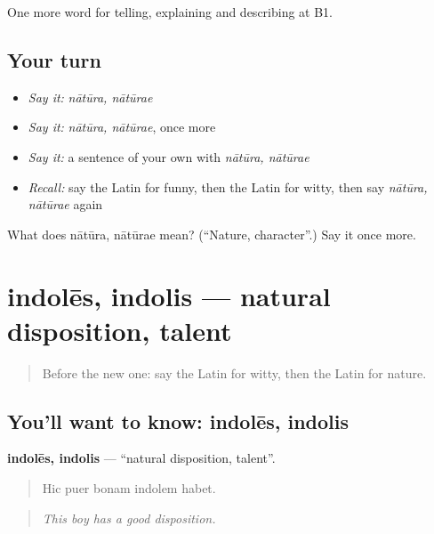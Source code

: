 \begin{grammarlens}[title={What you've built}]
One more word for telling, explaining and describing at B1.
\end{grammarlens}

\subsection*{Your turn}
\begin{itemize}
\raggedright
  \item \emph{Say it:} \emph{nātūra, nātūrae}
  \item \emph{Say it:} \emph{nātūra, nātūrae}, once more
  \item \emph{Say it:} a sentence of your own with \emph{nātūra, nātūrae}
  \item \emph{Recall:} say the Latin for funny, then the Latin for witty, then say \emph{nātūra, nātūrae} again
\end{itemize}

\begin{tcolorbox}[breakable,colback=teal!4,colframe=teal!35!black,title={Before you move on}]
What does nātūra, nātūrae mean? (\textquotedblleft{}Nature, character\textquotedblright{}.) Say it once more.
\end{tcolorbox}
\section[indolēs, indolis]{indolēs, indolis — natural disposition, talent}

\label{lesson:LA-C503-indoles}



\begin{quote}
Before the new one: say the Latin for witty, then the Latin for nature.
\end{quote}

\subsection*{You'll want to know: indolēs, indolis}
\textbf{indolēs, indolis} — \textquotedblleft{}natural disposition, talent\textquotedblright{}.

\begin{quote}
Hic puer bonam indolem habet.
\end{quote}

\begin{quote}
\emph{This boy has a good disposition.}
\end{quote}

